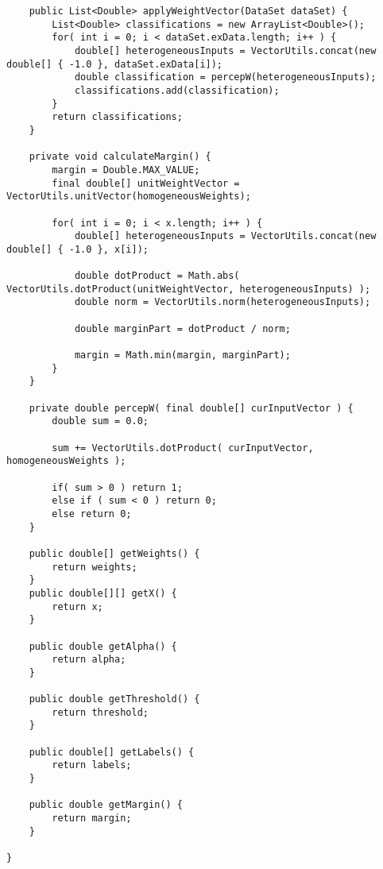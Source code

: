 \begin{lstlisting}
	public List<Double> applyWeightVector(DataSet dataSet) {
		List<Double> classifications = new ArrayList<Double>();
		for( int i = 0; i < dataSet.exData.length; i++ ) {
			double[] heterogeneousInputs = VectorUtils.concat(new double[] { -1.0 }, dataSet.exData[i]);
			double classification = percepW(heterogeneousInputs);
			classifications.add(classification);
		}
		return classifications;
	}
	
	private void calculateMargin() {
		margin = Double.MAX_VALUE;
		final double[] unitWeightVector = VectorUtils.unitVector(homogeneousWeights);
		
		for( int i = 0; i < x.length; i++ ) {
			double[] heterogeneousInputs = VectorUtils.concat(new double[] { -1.0 }, x[i]);
			
			double dotProduct = Math.abs( VectorUtils.dotProduct(unitWeightVector, heterogeneousInputs) );
			double norm = VectorUtils.norm(heterogeneousInputs);
			
			double marginPart = dotProduct / norm;
			
			margin = Math.min(margin, marginPart);
		}
	}
	
	private double percepW( final double[] curInputVector ) {
		double sum = 0.0;
		
		sum += VectorUtils.dotProduct( curInputVector, homogeneousWeights );
		
		if( sum > 0 ) return 1;
		else if ( sum < 0 ) return 0;
		else return 0;
	}

	public double[] getWeights() {
		return weights;
	}
	public double[][] getX() {
		return x;
	}

	public double getAlpha() {
		return alpha;
	}

	public double getThreshold() {
		return threshold;
	}

	public double[] getLabels() {
		return labels;
	}

	public double getMargin() {
		return margin;
	}

}
\end{lstlisting}


